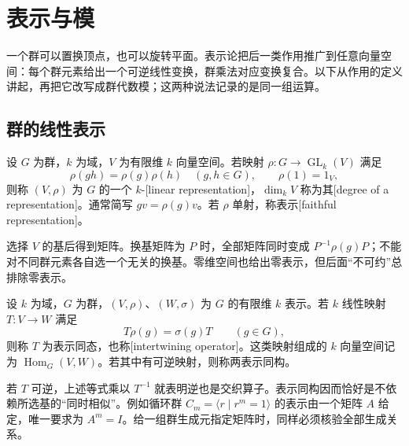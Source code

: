 

\section{表示与模}
\label{b5:sec:0101}

一个群可以置换顶点，也可以旋转平面。表示论把后一类作用推广到任意向量空间：每个群元素给出一个可逆线性变换，群乘法对应变换复合。以下从作用的定义讲起，再把它改写成群代数模；这两种说法记录的是同一组运算。


\subsection{群的线性表示}
\label{b5:subsec:0101:01}

\begin{definition}\label{b5:def:linear-representation}
	设 \(G\) 为群，\(k\) 为域，\(V\) 为有限维 \(k\) 向量空间。若映射 \(\rho:G\to\operatorname{GL}_k(V)\) 满足
	\[
		\rho(gh)=\rho(g)\rho(h)\quad(g,h\in G),\qquad \rho(1)=1_V,
	\]
	则称 \((V,\rho)\) 为 \(G\) 的一个 \(k\)-[linear representation]，\(\dim_kV\) 称为其[degree of a representation]。通常简写 \(gv=\rho(g)v\)。若 \(\rho\) 单射，称表示[faithful representation]。
\end{definition}

选择 \(V\) 的基后得到矩阵。换基矩阵为 \(P\) 时，全部矩阵同时变成 \(P^{-1}\rho(g)P\)；不能对不同群元素各自选一个无关的换基。零维空间也给出零表示，但后面“不可约”总排除零表示。

\begin{definition}\label{b5:def:intertwiner}
	设 \(k\) 为域，\(G\) 为群，\((V,\rho)\)、\((W,\sigma)\) 为 \(G\) 的有限维 \(k\) 表示。若 \(k\) 线性映射 \(T:V\to W\) 满足
	\[
		T\rho(g)=\sigma(g)T\qquad(g\in G),
	\]
	则称 \(T\) 为表示同态，也称[intertwining operator]。这类映射组成的 \(k\) 向量空间记为 \(\operatorname{Hom}_G(V,W)\)。若其中有可逆映射，则称两表示同构。
\end{definition}

若 \(T\) 可逆，上述等式乘以 \(T^{-1}\) 就表明逆也是交织算子。表示同构因而恰好是不依赖所选基的“同时相似”。例如循环群 \(C_m=\langle r\mid r^m=1\rangle\) 的表示由一个矩阵 \(A\) 给定，唯一要求为 \(A^m=I\)。给一组群生成元指定矩阵时，同样必须核验全部生成关系。

